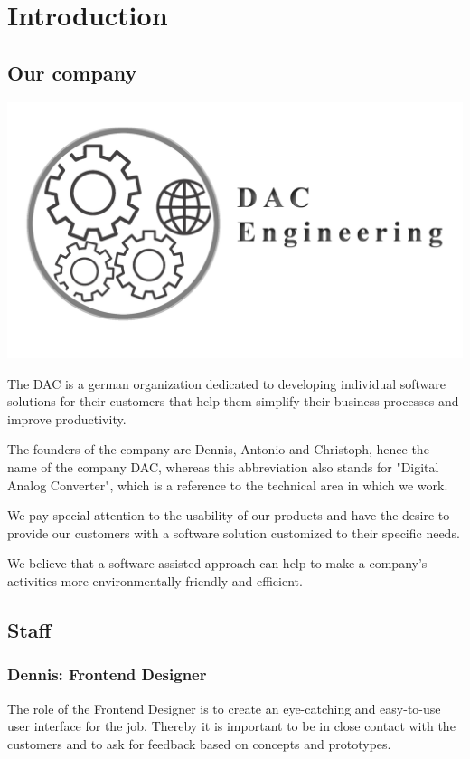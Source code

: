 
\chapter{Introduction}
\label{sec:org4319e3a}

\section{Our company}
\label{sec:orgd179591}

\begin{center}
\includegraphics[width=.9\linewidth]{./content/dac-logo.png}
\end{center}
The DAC is a german organization dedicated to developing individual software
solutions for their customers that help them simplify their business processes
and improve productivity.

The founders of the company are Dennis, Antonio and Christoph, hence the name of
the company DAC, whereas this abbreviation also stands for "Digital Analog
Converter", which is a reference to the technical area in which we work.

We pay special attention to the usability of our products and have the desire to
provide our customers with a software solution customized to their specific
needs.

We believe that a software-assisted approach can help to make a company's
activities more environmentally friendly and efficient.

\section{Staff}
\label{sec:org5dfa11e}
\subsection{Dennis: Frontend Designer}
\label{sec:org6caf21f}
The role of the Frontend Designer is to create an eye-catching and easy-to-use
user interface for the job. Thereby it is important to be in close contact
with the customers and to ask for feedback based on concepts and prototypes.
